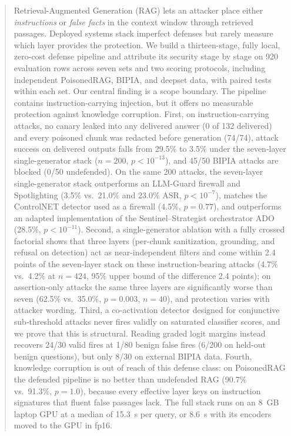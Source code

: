 \documentclass[conference]{IEEEtran}
\begin{document}
\begin{abstract}
Retrieval-Augmented Generation (RAG) lets an attacker place either \emph{instructions} or \emph{false facts} in the context window through retrieved passages. Deployed systems stack imperfect defenses but rarely measure which layer provides the protection. We build a thirteen-stage, fully local, zero-cost defense pipeline and attribute its security stage by stage on 920 evaluation rows across seven sets and two scoring protocols, including independent PoisonedRAG, BIPIA, and deepset data, with paired tests within each set. Our central finding is a scope boundary. The pipeline contains instruction-carrying injection, but it offers no measurable protection against knowledge corruption. First, on instruction-carrying attacks, no canary leaked into any delivered answer (0 of 132 delivered) and every poisoned chunk was redacted before generation (74/74), attack success on delivered outputs falls from 29.5\% to 3.5\% under the seven-layer single-generator stack ($n=200$, $p<10^{-13}$), and 45/50 BIPIA attacks are blocked (0/50 undefended). On the same 200 attacks, the seven-layer single-generator stack outperforms an LLM-Guard firewall and Spotlighting (3.5\% vs.\ 21.0\% and 23.0\% ASR, $p<10^{-7}$), matches the ControlNET detector used as a firewall (4.5\%, $p=0.77$), and outperforms an adapted implementation of the Sentinel--Strategist orchestrator ADO (28.5\%, $p<10^{-11}$). Second, a single-generator ablation with a fully crossed factorial shows that three layers (per-chunk sanitization, grounding, and refusal on detection) act as near-independent filters and come within 2.4 points of the seven-layer stack on these instruction-bearing attacks (4.7\% vs.\ 4.2\% at $n=424$, 95\% upper bound of the difference 2.4 points); on assertion-only attacks the same three layers are significantly worse than seven (62.5\% vs.\ 35.0\%, $p=0.003$, $n=40$), and protection varies with attacker wording. Third, a co-activation detector designed for conjunctive sub-threshold attacks never fires validly on saturated classifier scores, and we prove that this is structural. Reading graded logit margins instead recovers 24/30 valid fires at 1/80 benign false fires (6/200 on held-out benign questions), but only 8/30 on external BIPIA data. Fourth, knowledge corruption is out of reach of this defense class: on PoisonedRAG the defended pipeline is no better than undefended RAG (90.7\% vs.\ 91.3\%, $p=1.0$), because every effective layer keys on instruction signatures that fluent false passages lack. The full stack runs on an 8~GB laptop GPU at a median of 15.3~s per query, or 8.6~s with its encoders moved to the GPU in fp16.
\end{abstract}
\end{document}
